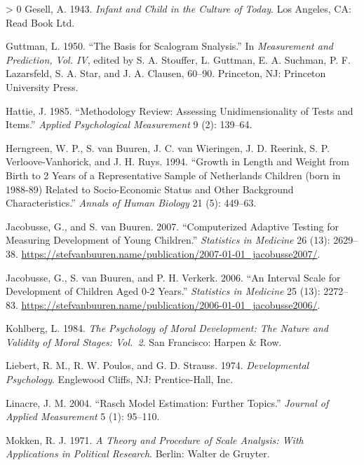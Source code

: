 \documentclass[
]{book}
\newlength{\cslhangindent}
\newenvironment{CSLReferences}[3] %
 {%
  \setlength{\parindent}{0pt}
  \ifodd #1 \everypar{\setlength{\hangindent}{\cslhangindent}}\ignorespaces\fi
  \ifnum #2 > 0
  \setlength{\parskip}{#2\baselineskip}
  \fi
 }%
 {}
\begin{document}
\begin{CSLReferences}{1}{0}
\leavevmode\hypertarget{ref-gesell1943}{}%
Gesell, A. 1943. \emph{Infant and Child in the Culture of Today}. Los Angeles, CA: Read Book Ltd.

\leavevmode\hypertarget{ref-guttman1950}{}%
Guttman, L. 1950. {``The Basis for Scalogram Snalysis.''} In \emph{Measurement and Prediction, Vol. IV}, edited by S. A. Stouffer, L. Guttman, E. A. Suchman, P. F. Lazarsfeld, S. A. Star, and J. A. Clausen, 60--90. Princeton, NJ: Princeton University Press.

\leavevmode\hypertarget{ref-hattie1985}{}%
Hattie, J. 1985. {``Methodology Review: Assessing Unidimensionality of Tests and Items.''} \emph{Applied Psychological Measurement} 9 (2): 139--64.

\leavevmode\hypertarget{ref-herngreen1994}{}%
Herngreen, W. P., S. van Buuren, J. C. van Wieringen, J. D. Reerink, S. P. Verloove-Vanhorick, and J. H. Ruys. 1994. {``Growth in Length and Weight from Birth to 2 Years of a Representative Sample of Netherlands Children (born in 1988-89) Related to Socio-Economic Status and Other Background Characteristics.''} \emph{Annals of Human Biology} 21 (5): 449--63.

\leavevmode\hypertarget{ref-jacobusse2007}{}%
Jacobusse, G., and S. van Buuren. 2007. {``Computerized Adaptive Testing for Measuring Development of Young Children.''} \emph{Statistics in Medicine} 26 (13): 2629--38. \url{https://stefvanbuuren.name/publication/2007-01-01_jacobusse2007/}.

\leavevmode\hypertarget{ref-jacobusse2006}{}%
Jacobusse, G., S. van Buuren, and P. H. Verkerk. 2006. {``An Interval Scale for Development of Children Aged 0-2 Years.''} \emph{Statistics in Medicine} 25 (13): 2272--83. \url{https://stefvanbuuren.name/publication/2006-01-01_jacobusse2006/}.

\leavevmode\hypertarget{ref-kohlberg1984}{}%
Kohlberg, L. 1984. \emph{The Psychology of Moral Development: The Nature and Validity of Moral Stages: Vol.~2}. San Francisco: Harpen \& Row.

\leavevmode\hypertarget{ref-liebert1974}{}%
Liebert, R. M., R. W. Poulos, and G. D. Strauss. 1974. \emph{Developmental Psychology}. Englewood Cliffs, NJ: Prentice-Hall, Inc.

\leavevmode\hypertarget{ref-linacre2004}{}%
Linacre, J. M. 2004. {``Rasch Model Estimation: Further Topics.''} \emph{Journal of Applied Measurement} 5 (1): 95--110.

\leavevmode\hypertarget{ref-mokken1971}{}%
Mokken, R. J. 1971. \emph{A Theory and Procedure of Scale Analysis: With Applications in Political Research}. Berlin: Walter de Gruyter.


\end{CSLReferences}
\end{document}
